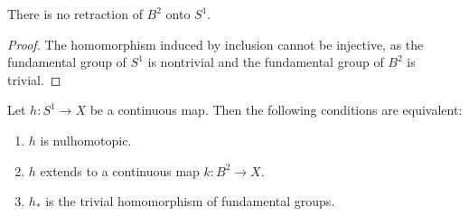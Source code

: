 \begin{theorem}
There is no retraction of $B^2$ onto $S^1$.
\end{theorem}

\begin{proof}
The homomorphism induced by inclusion cannot be injective, as the fundamental group of $S^1$ is nontrivial and the fundamental group of $B^2$ is trivial.
\end{proof}

\begin{lemma}
Let $h\colon S^1 \rightarrow X$ be a continuous map. Then the following conditions are equivalent:
\begin{enumerate}[1)]
    \item $h$ is nulhomotopic.
    \item $h$ extends to a continuous map $k\colon B^2 \rightarrow X$.
    \item $h_{\ast}$ is the trivial homomorphism of fundamental groups.
\end{enumerate}
\end{lemma}


